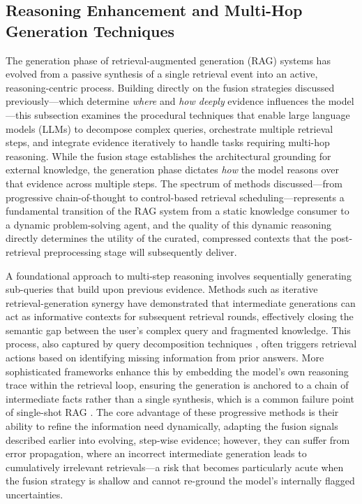 \documentclass[11pt,a4paper]{article}
\begin{document}
\subsection{Reasoning Enhancement and Multi-Hop Generation Techniques}


The generation phase of retrieval-augmented generation (RAG) systems has evolved from a passive synthesis of a single retrieval event into an active, reasoning-centric process. Building directly on the fusion strategies discussed previously---which determine \emph{where} and \emph{how deeply} evidence influences the model---this subsection examines the procedural techniques that enable large language models (LLMs) to decompose complex queries, orchestrate multiple retrieval steps, and integrate evidence iteratively to handle tasks requiring multi-hop reasoning. While the fusion stage establishes the architectural grounding for external knowledge, the generation phase dictates \emph{how} the model reasons over that evidence across multiple steps. The spectrum of methods discussed---from progressive chain-of-thought to control-based retrieval scheduling---represents a fundamental transition of the RAG system from a static knowledge consumer to a dynamic problem-solving agent, and the quality of this dynamic reasoning directly determines the utility of the curated, compressed contexts that the post-retrieval preprocessing stage will subsequently deliver.

A foundational approach to multi-step reasoning involves sequentially generating sub-queries that build upon previous evidence. Methods such as iterative retrieval-generation synergy \cite{arxiv:2305.15294v2} have demonstrated that intermediate generations can act as informative contexts for subsequent retrieval rounds, effectively closing the semantic gap between the user's complex query and fragmented knowledge. This process, also captured by query decomposition techniques \cite{arxiv:2009.12756v2}, often triggers retrieval actions based on identifying missing information from prior answers. More sophisticated frameworks enhance this by embedding the model's own reasoning trace within the retrieval loop, ensuring the generation is anchored to a chain of intermediate facts rather than a single synthesis, which is a common failure point of single-shot RAG \cite{arxiv:2408.08067v2}. The core advantage of these progressive methods is their ability to refine the information need dynamically, adapting the fusion signals described earlier into evolving, step-wise evidence; however, they can suffer from error propagation, where an incorrect intermediate generation leads to cumulatively irrelevant retrievals---a risk that becomes particularly acute when the fusion strategy is shallow and cannot re-ground the model's internally flagged uncertainties.
\end{document}
